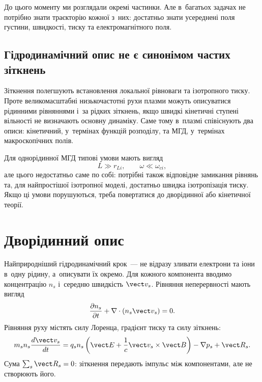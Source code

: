 До цього моменту ми розглядали окремі частинки. Але в~багатьох задачах не потрібно знати
траєкторію кожної з~них: достатньо знати усереднені поля густини, швидкості, тиску та
електромагнітного поля.



\subsection{Гідродинамічний опис не є синонімом частих зіткнень}



Зіткнення полегшують встановлення локальної рівноваги та ізотропного тиску. Проте
великомасштабні низькочастотні рухи плазми можуть описуватися рідинними рівняннями і~за
рідких зіткнень, якщо швидкі кінетичні ступені вільності не визначають основну динаміку.
Саме тому в~плазмі співіснують два описи: кінетичний, у~термінах функцій розподілу, та
МГД, у~термінах макроскопічних полів.

Для однорідинної МГД типові умови мають вигляд
\begin{equation*}
L\gg r_{Li},\qquad \omega\ll\omega_{ci},
\end{equation*}
але цього недостатньо саме по собі: потрібні також відповідне замикання рівнянь та, для
найпростішої ізотропної моделі, достатньо швидка ізотропізація тиску. Якщо ці умови
порушуються, треба повертатися до дворідинної або кінетичної теорії.



\section{Дворідинний опис}



Найприродніший гідродинамічний крок~--- не відразу зливати електрони та іони в~одну
рідину, а~описувати їх окремо. Для кожного компонента вводимо концентрацію $n_s$ і~середню
швидкість $\vect v_s$. Рівняння неперервності мають вигляд
\begin{equation*}
 \frac{\partial n_s}{\partial t}
 +\nabla\cdot(n_s\vect v_s)=0.
\end{equation*}
Рівняння руху містять силу Лоренца, градієнт тиску та силу зіткнень:
\begin{equation*}
 m_s n_s\frac{d\vect v_s}{dt}
 =
 q_s n_s\left(\vect E+\frac1c\vect v_s\times\vect B\right)
 -\nabla p_s+\vect R_s.
\end{equation*}
Сума $\sum_s\vect R_s=0$: зіткнення передають імпульс між компонентами, але не створюють
його.

